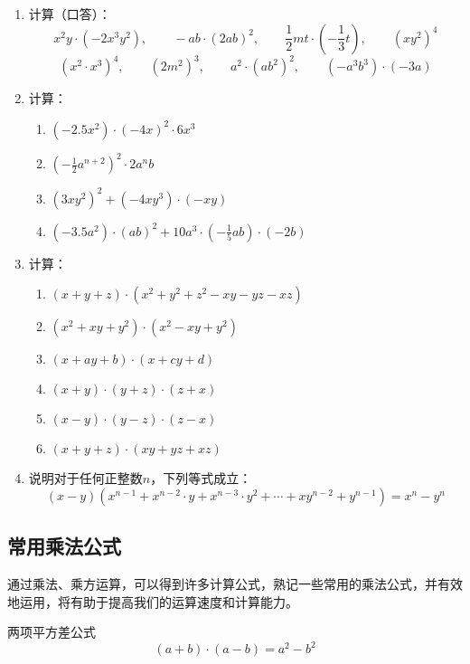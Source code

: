 \begin{ex}
\begin{enumerate}
    \item 计算（口答）：
    \[x^2y\cdot (-2x^3y^2),\qquad -ab\cdot (2ab)^2,\qquad \frac{1}{2}mt\cdot \left(-\frac{1}{3}t\right),\qquad (xy^2)^4 \]
    \[(x^2\cdot x^3)^4,\qquad (2m^2)^3,\qquad a^2\cdot (ab^2)^2,\qquad (-a^3b^3)\cdot (-3a) \]
    \item 计算：
\begin{enumerate}
    \item $(-2.5x^2)\cdot (-4x)^2\cdot 6x^3$
    \item $\left(-\frac{1}{2}a^{n+2}\right)^2\cdot 2a^n b$
    \item $(3xy^2)^2+(-4xy^3)\cdot (-xy)$
    \item $(-3.5a^2)\cdot (ab)^2+10a^3\cdot \left(-\frac{1}{5}ab\right)\cdot (-2b)$
\end{enumerate}
\item 计算：
\begin{enumerate}
    \item $(x+y+z)\cdot (x^2+y^2+z^2-xy-yz-xz)$
    \item $(x^2+xy+y^2)\cdot (x^2-xy+y^2)$
    \item $(x+ay+b)\cdot (x+cy+d)$
    \item $(x+y)\cdot (y+z)\cdot(z+x)$
    \item $(x-y)\cdot (y-z)\cdot(z-x)$
    \item $(x+y+z)\cdot (xy+yz+xz)$
\end{enumerate}
\item 说明对于任何正整数$n$，下列等式成立：
\[(x-y)\left(x^{n-1}+x^{n-2}\cdot y+x^{n-3}\cdot y^2+\cdots+xy^{n-2}+y^{n-1}\right)=x^n-y^n \]
\end{enumerate}
\end{ex}    

\subsection{常用乘法公式}

通过乘法、乘方运算，可以得到许多计算公式，熟记一些常用的乘法公式，并有效地运用，将有助于提高我们的运算速度和计算能力。

\begin{blk}{两项平方差公式}
    \begin{equation*}
        (a+b) \cdot (a-b) =a^2-b^2 \tag{I}  
    \end{equation*}
\end{blk}


